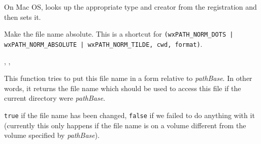 \label{wxfilenamemacsetdefaulttypeandcreator}


On Mac OS, looks up the appropriate type and creator from the registration and then sets it.

\label{wxfilenamemakeabsolute}


Make the file name absolute. This is a shortcut for
{\tt {}(wxPATH\_NORM\_DOTS | wxPATH\_NORM\_ABSOLUTE | wxPATH\_NORM\_TILDE, cwd, format)}.


,
,


\label{wxfilenamemakerelativeto}


This function tries to put this file name in a form relative to {\it pathBase}.
In other words, it returns the file name which should be used to access this
file if the current directory were {\it pathBase}.




{\tt true} if the file name has been changed, {\tt false} if we failed to do
anything with it (currently this only happens if the file name is on a volume
different from the volume specified by {\it pathBase}).




\label{wxfilenamemkdir}



